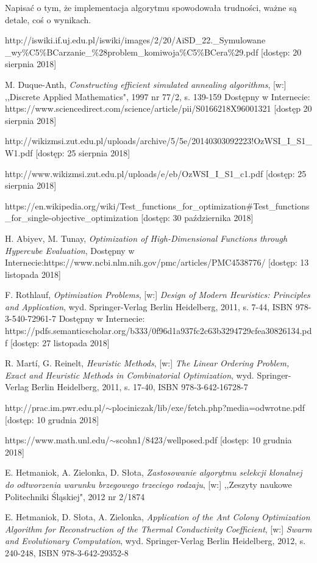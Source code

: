 \documentclass[twoside]{projektInzynierskiMS1}
\newcommand{\si}{ś}
\begin{document}
%
Napisać o tym, że implementacja algorytmu spowodowała trudno\si ci, ważne są detale, coś o wynikach.
%

\begin{thebibliography}{12}

 http://iswiki.if.uj.edu.pl/iswiki/images/2/20/AiSD\_22.\_Symulowane \_wy\%C5\%BCarzanie\_\%28problem\_komiwoja\%C5\%BCera\%29.pdf [dostęp: 20 sierpnia 2018]

 M. Duque-Anth, \textit{Constructing efficient simulated annealing algorithms}, [w:] ,,Discrete Applied Mathematics", 1997 nr 77/2, s. 139-159 Dostępny w Internecie: https://www.sciencedirect.com/science/article/pii/S0166218X96001321
[dostęp 20 sierpnia 2018]

 http://wikizmsi.zut.edu.pl/uploads/archive/5/5e/20140303092223!OzWSI\_I\_S1\_W1.pdf
[dostęp: 25 sierpnia 2018]

 http://www.wikizmsi.zut.edu.pl/uploads/e/eb/OzWSI\_I\_S1\_c1.pdf
[dostęp: 25 sierpnia 2018]

 https://en.wikipedia.org/wiki/Test\_functions\_for\_optimization\#Test\_functions\_for\_single-objective\_optimization [dostęp: 30 października 2018]

 H. Abiyev, M. Tunay, \textit{Optimization of High-Dimensional Functions through Hypercube Evaluation}, Dostępny w Internecie:https://www.ncbi.nlm.nih.gov/pmc/articles/PMC4538776/
[dostęp: 13 listopada 2018]


 F. Rothlauf, \textit{Optimization Problems}, [w:] \textit{Design of Modern Heuristics: Principles and Application}, wyd. Springer-Verlag Berlin Heidelberg, 2011, s. 7-44, ISBN 978-3-540-72961-7
Dostępny w Internecie: https://pdfs.semanticscholar.org/b333/0f96d1a937fc2c63b3294729cfea30826134.pdf
[dostęp: 27 listopada 2018]

 R. Martí, G. Reinelt, \textit{Heuristic Methods}, [w:] \textit{The Linear Ordering Problem, Exact and Heuristic Methods in Combinatorial Optimization}, wyd. Springer-Verlag Berlin Heidelberg, 2011, s. 17-40, ISBN 978-3-642-16728-7

 http://prac.im.pwr.edu.pl/$\sim$plociniczak/lib/exe/fetch.php?media=odwrotne.pdf
[dostęp: 10 grudnia 2018]

 https://www.math.unl.edu/$\sim$scohn1/8423/wellposed.pdf
 [dostęp: 10 grudnia 2018]

E. Hetmaniok, A. Zielonka, D. Słota, \textit{Zastosowanie algorytmu selekcji klonalnej do odtworzenia warunku brzegowego trzeciego rodzaju}, [w:] ,,Zeszyty naukowe Politechniki Śląskiej", 2012 nr 2/1874

 E. Hetmaniok, D. Słota, A. Zielonka, \textit{Application of the Ant Colony Optimization Algorithm for Reconstruction of the Thermal Conductivity Coefficient}, [w:] \textit{Swarm and Evolutionary Computation}, wyd. Springer-Verlag Berlin Heidelberg,  2012,  s. 240-248, ISBN 978-3-642-29352-8


\end{thebibliography}
\end{document}
